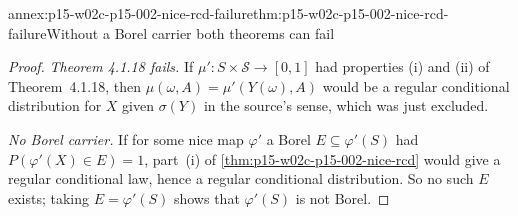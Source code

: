 \begin{annexitem}{annex:p15-w02c-p15-002-nice-rcd-failure}{thm:p15-w02c-p15-002-nice-rcd-failure}{Without a Borel carrier both theorems can fail}
\begin{proof}
\emph{Theorem 4.1.18 fails.} If \(\mu':S\times\mathcal S\to[0,1]\) had
properties (i) and (ii) of Theorem~4.1.18, then
\(\mu(\omega,A)=\mu'(Y(\omega),A)\) would be a regular conditional
distribution for \(X\) given \(\sigma(Y)\) in the source's sense, which
was just excluded.

\emph{No Borel carrier.} If for some nice map \(\varphi'\) a Borel
\(E\subseteq\varphi'(S)\) had \(P(\varphi'(X)\in E)=1\), part~(i) of
\cref{thm:p15-w02c-p15-002-nice-rcd} would give a regular conditional law,
hence a regular conditional distribution. So no such \(E\) exists; taking
\(E=\varphi'(S)\) shows that \(\varphi'(S)\) is not Borel.
\end{proof}
\end{annexitem}

